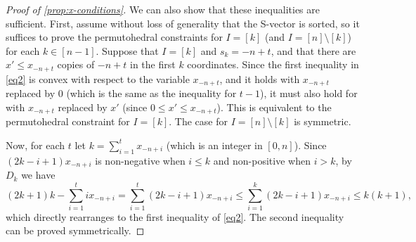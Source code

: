 \documentclass[10pt,a4paper]{amsart}
\begin{document}
\begin{proof}[Proof of \cref{prop:x-conditions}]
    We can also show that these inequalities are sufficient. First, assume without loss of generality that the S-vector is sorted, so it suffices to prove the permutohedral constraints for $I = [k]$ (and $I = [n]\setminus [k]$) for each $k \in [n-1]$. Suppose that $I = [k]$ and $s_k = -n+t$, and that there are $x'\leq x_{-n+t}$ copies of $-n+t$ in the first $k$ coordinates. Since the first inequality in \eqref{eq2} is convex with respect to the variable $x_{-n+t}$, and it holds with $x_{-n+t}$ replaced by $0$ (which is the same as the inequality for $t-1$), it must also hold for with $x_{-n+t}$ replaced by $x'$ (since $0\leq x' \leq x_{-n+t}$). This is equivalent to the permutohedral constraint for $I = [k]$. The case for $I = [n]\setminus [k]$ is symmetric.

    Now, for each $t$ let $k = \sum_{i=1}^t x_{-n+i}$ (which is an integer in $[0, n]$). Since $(2k-i+1)x_{-n+i}$ is non-negative when $i\leq k$ and non-positive when $i > k$, by $D_k$ we have \[(2k+1)k-\sum_{i=1}^t ix_{-n+i} = \sum_{i=1}^{t} (2k-i+1) x_{-n+i} \leq \sum_{i=1}^{k} (2k-i+1) x_{-n+i}\leq k(k+1),\] which directly rearranges to the first inequality of \eqref{eq2}. The second inequality can be proved symmetrically.
\end{proof}
\end{document}
